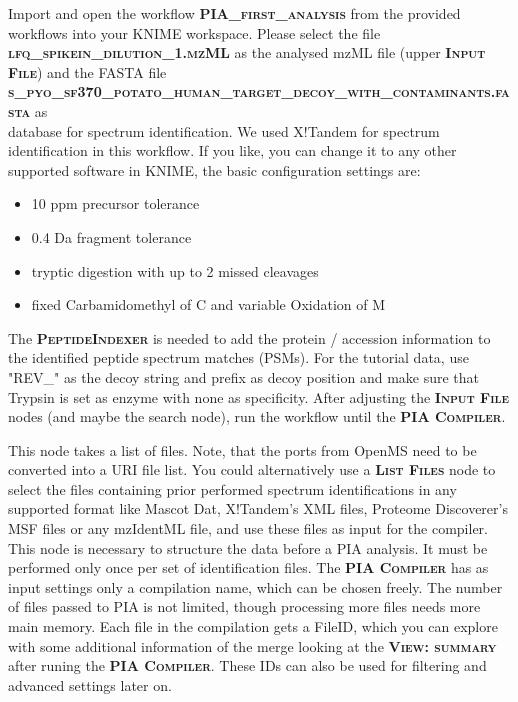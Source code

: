 \documentclass[a4paper,11pt,twoside]{article}
\newcommand{\menu}[1]{{\scshape\bfseries #1}}
\newcommand{\filepath}[1]{{\scshape\bfseries #1}}
\newcommand{\knimenode}[1]{{\scshape\bfseries #1}}
\begin{document}
Import and open the workflow \filepath{PIA\_first\_analysis} from the provided
workflows into your KNIME workspace. Please select the file
\filepath{lfq\_spikein\_dilution\_1.mzML} as the analysed mzML file (upper
\knimenode{Input File}) and the FASTA file \\
\filepath{s\_pyo\_sf370\_potato\_human\_target\_decoy\_with\_contaminants.fasta}
as \\ database for spectrum identification. We used X!Tandem for spectrum
identification in this workflow. If you like, you can change it to any other
supported software in KNIME, the basic configuration settings are:

\begin{itemize}
	\item 10 ppm precursor tolerance
	\item 0.4 Da fragment tolerance
	\item tryptic digestion with up to 2 missed cleavages
	\item fixed Carbamidomethyl of C and variable Oxidation of M
\end{itemize}

The \knimenode{PeptideIndexer} is needed to add the protein / accession
information to the identified peptide spectrum matches (PSMs). For the tutorial
data, use "REV\_" as the decoy string and prefix as decoy position and make sure
that Trypsin is set as enzyme with none as specificity. After adjusting the
\knimenode{Input File} nodes (and maybe the search node), run the workflow until
the \knimenode{PIA Compiler}.

This node takes a list of files. Note, that the ports from OpenMS
need to be converted into a URI file list. You could alternatively use a
\knimenode{List Files} node to select the files containing prior performed
spectrum identifications in any supported format like Mascot Dat, X!Tandem's
XML files, Proteome Discoverer's MSF files or any mzIdentML file, and use these
files as input for the compiler. This node is necessary to structure the data
before a PIA analysis. It must be performed only once per set of identification
files. The \knimenode{PIA Compiler} has as input settings only a compilation
name, which can be chosen freely. The number of files passed to PIA is not
limited, though processing more files needs more main memory. Each file in the
compilation gets a FileID, which you can explore with some additional
information of the merge looking at the \menu{View: summary} after runing the
\knimenode{PIA Compiler}. These IDs can also be used for filtering and advanced
settings later on.
\end{document}
